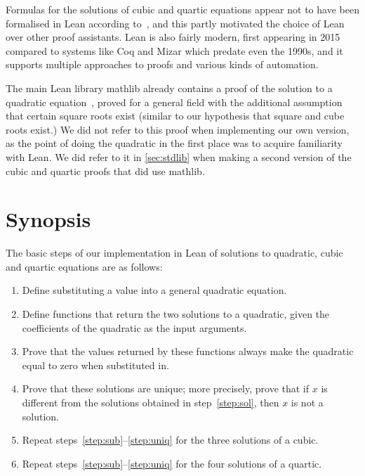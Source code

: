 \documentclass{article} %
\theoremstyle{plain}
\theoremstyle{definition}
\newcommand{\Lean}{\textsf{Lean}\xspace}
\newcommand{\mathlib}{\textsf{mathlib}\xspace}
\begin{document}
Formulas for the solutions of cubic and quartic equations
appear not to have been formalised in \Lean according to~\cite{100_theorems},
and this partly motivated the choice of \Lean over other proof assistants.
Lean is also fairly modern,
first appearing in 2015~\cite{lean_description}
compared to systems like Coq and Mizar which predate even the 1990s, and it supports multiple approaches to proofs and various kinds of automation.

The main \Lean library \mathlib already contains a proof
of the solution to a quadratic equation~\cite{mathlib_quadratic},
proved for a general field with the additional assumption that certain square roots exist (similar to our hypothesis that square and cube roots exist.)
%
We did not refer to this proof when implementing our own version,
as the point of doing the quadratic in the first place was to 
acquire familiarity with \Lean.
We did refer to it in \cref{sec:stdlib}
when making a second version of the cubic and quartic proofs
that did use \mathlib.


%



\section{Synopsis}
\label{sec:synopsis}

The basic steps of our implementation in \Lean of solutions to
quadratic, cubic and quartic equations are as follows:
\begin{enumerate}
\item\label{step:sub}
Define substituting a value into a general quadratic equation.
\item\label{step:sol}
Define functions that return the two solutions to a quadratic,
given the coefficients of the quadratic as the input arguments.
\item
Prove that the values returned by these functions always make
the quadratic equal to zero when substituted in.
\item\label{step:uniq}
Prove that these solutions are unique;
more precisely, prove that if $x$ is different from the solutions obtained in step~\ref{step:sol}, then $x$ is not a solution.
\item
Repeat steps~\ref{step:sub}--\ref{step:uniq}
for the three solutions of a cubic.
\item
Repeat steps~\ref{step:sub}--\ref{step:uniq}
for the four solutions of a quartic.
\end{enumerate}
\end{document}
